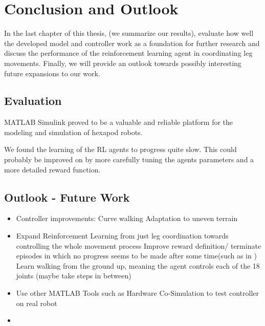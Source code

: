 \chapter{Conclusion and Outlook}
\label{ch:conclusion}

In the last chapter of this thesis, (we summarize our results), evaluate how well the developed model and controller work as a foundation for further research and discuss the performance of the reinforcement learning agent in coordinating leg movements.
Finally, we will provide an outlook towards possibly interesting future expansions to our work.


\section{Evaluation}

MATLAB Simulink proved to be a valuable and reliable platform for the modeling and simulation of hexapod robots.





We found the learning of the RL agents to progress quite slow. 
This could probably be improved on by more carefully tuning the agents parameters and a more detailed reward function.



\section{Outlook - Future Work}



\begin{itemize}
	
	\item Controller improvements:
		\subitem Curve walking
		\subitem Adaptation to uneven terrain
		\subitem 
	
	\item Expand Reinforcement Learning from just leg coordination towards controlling the whole movement process
		\subitem Improve reward definition/ terminate episodes in which no progress seems to be made after some time(such as in \cite{lillicrap2015continuous})
		\subitem Learn walking from the ground up, meaning the agent controls each of the 18 joints (maybe take steps in between)
		\subitem
	
	\item Use other MATLAB Tools such as Hardware Co-Simulation to test controller on real robot
	
	\item 
	
\end{itemize}